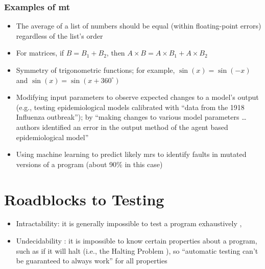 \subsubsection{Examples of \acs{mt}}
\begin{itemize}
      \item The average of a list of numbers should be equal (within
            floating-point errors) regardless of the list's order
            \cite[p.~67]{kanewala_metamorphic_2019}
      \item For matrices, if $B = B_1 + B_2$, then $A \times B = A \times B_1
                  + A \times B_2$ \cite[pp.~68-69]{kanewala_metamorphic_2019}
      \item Symmetry of trigonometric functions; for example, $\sin(x) = \sin(-x)$
            and $\sin(x) = \sin(x + 360^{\circ})$ \cite[p.~70]{kanewala_metamorphic_2019}
      \item Modifying input parameters to observe expected changes to a model's
            output (e.g., testing epidemiological models calibrated with
            ``data from the 1918 Influenza outbreak''); by ``making changes to
            various model parameters \dots authors identified an error in the
            output method of the agent based epidemiological model''
            \cite[p.~70]{kanewala_metamorphic_2019}
      \item Using machine learning to predict likely \acsp{mr} to identify
            faults in mutated versions of a program (about 90\% in this case)
            \cite[p.~71]{kanewala_metamorphic_2019}
\end{itemize}

\section{Roadblocks to Testing}

\begin{itemize}
      \item Intractability: it is generally impossible to test a program
            exhaustively \cite[p.~421]{van_vliet_software_2000},
            \cite[pp.~439,461]{peters_software_2000}
      \item Undecidability \cite[p.~439]{peters_software_2000}: it is
            impossible to know certain properties about a program, such as if
            it will halt (i.e., the Halting Problem
            \cite[p.~4]{gurfinkel_testing_2017}), so ``automatic testing
            can't be guaranteed to always work'' for all properties
            \cite{nelson_formal_1999} 
\end{itemize}

